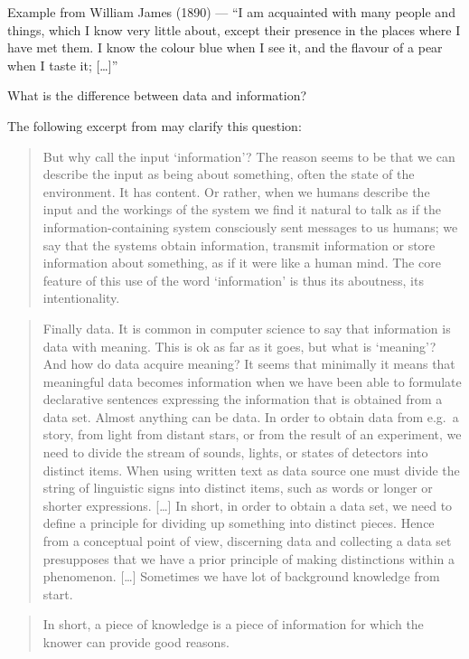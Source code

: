\documentclass[
]{book}
\begin{document}
Example from William James (1890) --- ``I am acquainted with many people and things, which I know very little about, except their presence in the places where I have met them. I know the colour blue when I see it, and the flavour of a pear when I taste it; {[}\ldots{]}''

What is the difference between data and information?

The following excerpt from \citep{johansson2016philosophy} may clarify this question:

\begin{quote}
But why call the input `information'? The reason seems to be that we can describe the input as being about something, often the state of the environment. It has content. Or rather, when we humans describe the input and the workings of the system we find it natural to talk as if the information-containing system consciously sent messages to us humans; we say that the systems obtain information, transmit information or store information about something, as if it were like a human mind. The core feature of this use of the word `information' is thus its aboutness, its intentionality.
\end{quote}

\begin{quote}
Finally data. It is common in computer science to say that information is data with meaning. This is ok as far as it goes, but what is `meaning'? And how do data acquire meaning? It seems that minimally it means that meaningful data becomes information when we have been able to formulate declarative sentences expressing the information that is obtained from a data set. Almost anything can be data. In order to obtain data from e.g.~a story, from light from distant stars, or from the result of an experiment, we need to divide the stream of sounds, lights, or states of detectors into distinct items. When using written text as data source one must divide the string of linguistic signs into distinct items, such as words or longer or shorter expressions. {[}\ldots{]} In short, in order to obtain a data set, we need to define a principle for dividing up something into distinct pieces. Hence from a conceptual point of view, discerning data and collecting a data set presupposes that we have a prior principle of making distinctions within a phenomenon. {[}\ldots{]} Sometimes we have lot of background knowledge from start.
\end{quote}

\begin{quote}
In short, a piece of knowledge is a piece of information for which the knower can provide good reasons.
\end{quote}
\end{document}
